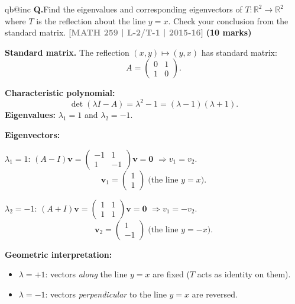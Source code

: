 \documentclass[12pt,a3paper]{article}
\makeatletter
\newcommand{\yr}[1]{\hfill\textcolor{gray}{\small\textbf{[#1]}}}
\newcommand{\mk}[1]{\textcolor{orange!70!black}{\small\textbf{(#1 marks)}}}
\newcounter{qnum}
\newcommand{\Q}[1]{%
  \csname qb@inc\endcsname
  \needspace{4\baselineskip}
  \refstepcounter{qnum}
  \vspace{6pt}
  \noindent\textbf{Q\theqnum.}\enspace #1\par
}
\makeatother
\begin{document}
\Q{Find the eigenvalues and corresponding eigenvectors of $T: \mathbb{R}^2 \to \mathbb{R}^2$ where $T$ is the reflection about the line $y = x$. Check your conclusion from the standard matrix.
\yr{MATH 259 | L-2/T-1 | 2015-16} \mk{10}}


\begin{tcolorbox}[enhanced,breakable,
  colback=cF!4,colframe=cF,boxrule=0.8pt,arc=5pt,
  title={\textbf{Answer --- Reflection about $y=x$: Eigenvalues \& Eigenvectors}},
  fonttitle=\bfseries\color{white},colbacktitle=cF]

\textbf{Standard matrix.} The reflection $(x,y)\mapsto(y,x)$ has standard matrix:
\[
A=\begin{pmatrix}0&1\\1&0\end{pmatrix}.
\]

\textbf{Characteristic polynomial:}
\[
\det(\lambda I-A)=\lambda^2-1=(\lambda-1)(\lambda+1).
\]
\textbf{Eigenvalues:} $\lambda_1=1$ and $\lambda_2=-1$.

\textbf{Eigenvectors:}

$\lambda_1=1$: $(A-I)\mathbf{v}=\begin{pmatrix}-1&1\\1&-1\end{pmatrix}\mathbf{v}=\mathbf{0}$
$\Rightarrow v_1=v_2$.
\[
\mathbf{v}_1=\begin{pmatrix}1\\1\end{pmatrix}\;\text{(the line }y=x\text{)}.
\]

$\lambda_2=-1$: $(A+I)\mathbf{v}=\begin{pmatrix}1&1\\1&1\end{pmatrix}\mathbf{v}=\mathbf{0}$
$\Rightarrow v_1=-v_2$.
\[
\mathbf{v}_2=\begin{pmatrix}1\\-1\end{pmatrix}\;\text{(the line }y=-x\text{)}.
\]

\textbf{Geometric interpretation:}
\begin{itemize}[itemsep=2pt]
  \item $\lambda=+1$: vectors \emph{along} the line $y=x$ are fixed ($T$ acts as identity on them).
  \item $\lambda=-1$: vectors \emph{perpendicular} to the line $y=x$ are reversed.
\end{itemize}


\end{tcolorbox}
\end{document}

